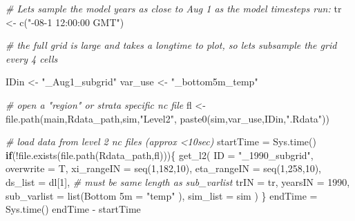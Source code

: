 \documentclass[
]{article}
\newenvironment{Shaded}{\begin{snugshade}}{\end{snugshade}}
\newcommand{\AttributeTok}[1]{\textcolor[rgb]{0.77,0.63,0.00}{#1}}
\newcommand{\CommentTok}[1]{\textcolor[rgb]{0.56,0.35,0.01}{\textit{#1}}}
\newcommand{\ControlFlowTok}[1]{\textcolor[rgb]{0.13,0.29,0.53}{\textbf{#1}}}
\newcommand{\DecValTok}[1]{\textcolor[rgb]{0.00,0.00,0.81}{#1}}
\newcommand{\FunctionTok}[1]{\textcolor[rgb]{0.00,0.00,0.00}{#1}}
\newcommand{\NormalTok}[1]{#1}
\newcommand{\OtherTok}[1]{\textcolor[rgb]{0.56,0.35,0.01}{#1}}
\newcommand{\SpecialCharTok}[1]{\textcolor[rgb]{0.00,0.00,0.00}{#1}}
\newcommand{\StringTok}[1]{\textcolor[rgb]{0.31,0.60,0.02}{#1}}
\begin{document}
\begin{Shaded}
\begin{Highlighting}[]
    \CommentTok{\# Let\textquotesingle{}s sample the model years as close to Aug 1 as the model timesteps run:}
\NormalTok{    tr          }\OtherTok{\textless{}{-}} \FunctionTok{c}\NormalTok{(}\StringTok{"{-}08{-}1 12:00:00 GMT"}\NormalTok{) }
    
    \CommentTok{\# the full grid is large and takes a longtime to plot, so let\textquotesingle{}s subsample the grid every 4 cells}
   
\NormalTok{    IDin       }\OtherTok{\textless{}{-}} \StringTok{"\_Aug1\_subgrid"}
\NormalTok{    var\_use    }\OtherTok{\textless{}{-}} \StringTok{"\_bottom5m\_temp"}
    
    \CommentTok{\# open a "region" or strata specific nc file}
\NormalTok{    fl         }\OtherTok{\textless{}{-}} \FunctionTok{file.path}\NormalTok{(main,Rdata\_path,sim,}\StringTok{"Level2"}\NormalTok{,}
                            \FunctionTok{paste0}\NormalTok{(sim,var\_use,IDin,}\StringTok{".Rdata"}\NormalTok{))}
    
   \CommentTok{\# load data from level 2 nc files (approx \textless{}10sec)}
\NormalTok{    startTime }\OtherTok{=} \FunctionTok{Sys.time}\NormalTok{()}
    \ControlFlowTok{if}\NormalTok{(}\SpecialCharTok{!}\FunctionTok{file.exists}\NormalTok{(}\FunctionTok{file.path}\NormalTok{(Rdata\_path,fl)))\{}
      \FunctionTok{get\_l2}\NormalTok{(}
        \AttributeTok{ID          =} \StringTok{"\_1990\_subgrid"}\NormalTok{,}
        \AttributeTok{overwrite   =}\NormalTok{ T,}
        \AttributeTok{xi\_rangeIN  =} \FunctionTok{seq}\NormalTok{(}\DecValTok{1}\NormalTok{,}\DecValTok{182}\NormalTok{,}\DecValTok{10}\NormalTok{),}
        \AttributeTok{eta\_rangeIN =} \FunctionTok{seq}\NormalTok{(}\DecValTok{1}\NormalTok{,}\DecValTok{258}\NormalTok{,}\DecValTok{10}\NormalTok{),}
        \AttributeTok{ds\_list     =}\NormalTok{ dl[}\DecValTok{1}\NormalTok{],  }\CommentTok{\# must be same length as sub\_varlist}
        \AttributeTok{trIN        =}\NormalTok{ tr,}
        \AttributeTok{yearsIN     =} \DecValTok{1990}\NormalTok{,}
        \AttributeTok{sub\_varlist =} \FunctionTok{list}\NormalTok{(}\StringTok{\textquotesingle{}Bottom 5m\textquotesingle{}} \OtherTok{=} \StringTok{"temp"}\NormalTok{ ),  }
        \AttributeTok{sim\_list    =}\NormalTok{ sim  )}
\NormalTok{    \}}
\NormalTok{    endTime  }\OtherTok{=} \FunctionTok{Sys.time}\NormalTok{()}
\NormalTok{    endTime  }\SpecialCharTok{{-}}\NormalTok{ startTime}
    

\end{Highlighting}
\end{Shaded}
\end{document}

